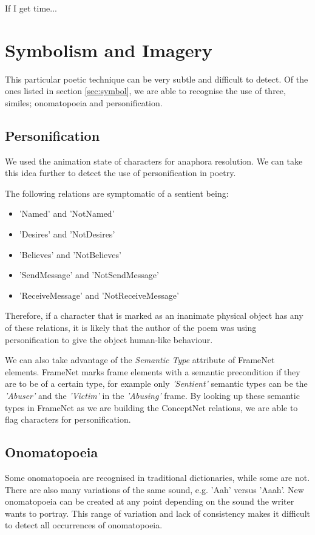 If I get time...


\section{Symbolism and Imagery}

This particular poetic technique can be very subtle and difficult to detect. Of the ones listed in section \ref{sec:symbol}, we are able to recognise the use of three, similes; onomatopoeia and personification.

\subsection{Personification}

We used the animation state of characters for anaphora resolution. We can take this idea further to detect the use of personification in poetry.

The following relations are symptomatic of a sentient being:

\begin{itemize}
\item{'Named' and 'NotNamed'}
\item{'Desires' and 'NotDesires'}
\item{'Believes' and 'NotBelieves'}
\item{'SendMessage' and 'NotSendMessage'}
\item{'ReceiveMessage' and 'NotReceiveMessage'}
\end{itemize}

Therefore, if a character that is marked as an inanimate physical object has any of these relations, it is likely that the author of the poem was using personification to give the object human-like behaviour.

We can also take advantage of the \textit{Semantic Type} attribute of FrameNet elements. FrameNet marks frame elements with a semantic precondition if they are to be of a certain type, for example only \textit{'Sentient'} semantic types can be the \textit{'Abuser'} and the \textit{'Victim'} in the \textit{'Abusing'} frame. By looking up these semantic types in FrameNet as we are building the ConceptNet relations, we are able to flag characters for personification.

\subsection{Onomatopoeia}
\label{sec:ono}
Some onomatopoeia are recognised in traditional dictionaries, while some are not. There are also many variations of the same sound, e.g. 'Aah' versus 'Aaah'. New onomatopoeia can be created at any point depending on the sound the writer wants to portray. This range of variation and lack of consistency makes it difficult to detect all occurrences of onomatopoeia.

